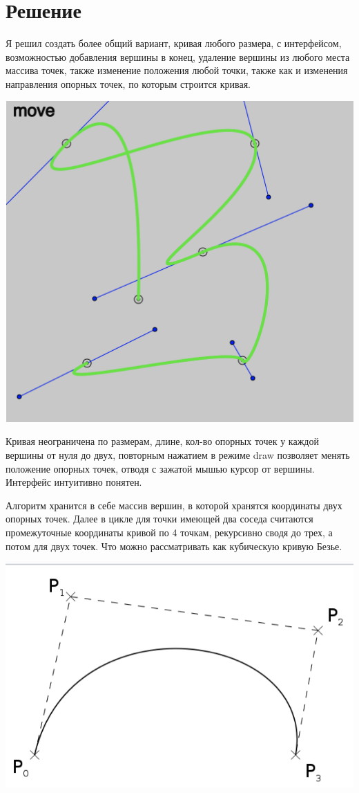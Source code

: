 \section{Решение}

Я решил создать более общий вариант, кривая любого размера, с интерфейсом, возможностью добавления вершины в конец, удаление вершины из любого места массива точек, также изменение положения любой точки, также как и изменения направления опорных точек, по которым строится кривая.



\includegraphics[scale=0.5]{pictures/1.png}

Кривая неограничена по размерам, длине, кол-во опорных точек у каждой вершины от нуля до двух, повторным нажатием в режиме draw позволяет менять положение опорных точек, отводя с зажатой мышью курсор от вершины. Интерфейс интуитивно понятен.

Алгоритм хранится в себе массив вершин, в которой хранятся координаты двух опорных точек. Далее в цикле для точки имеющей два соседа считаются промежуточные координаты кривой по 4 точкам, рекурсивно сводя до трех, а потом для двух точек. Что можно рассматривать как кубическую кривую Безье.

\includegraphics[scale=0.5]{pictures/3.png}

